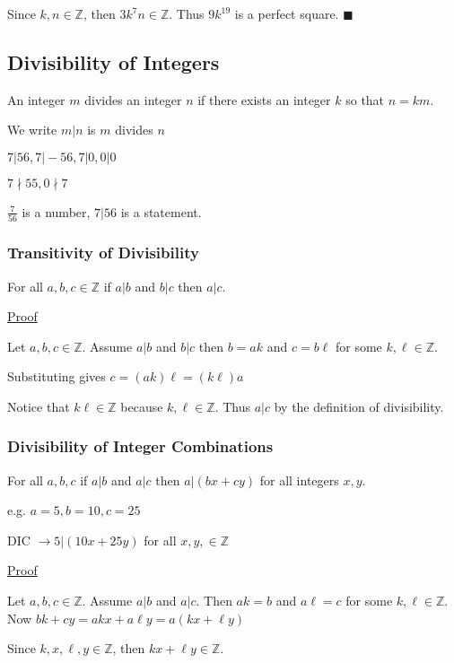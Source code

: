 \documentclass{article}
\begin{document}
Since $k,n \in \mathbb{Z}$, then $3k^7n \in \mathbb{Z}$. Thus $9k^{19}$ is a perfect square. $\blacksquare$

\subsection{Divisibility of Integers}

An integer $m$ divides an integer $n$ if there exists an integer $k$ so that $n = km$.

We write $m \vert n$ is $m$ divides $n$

$7 \vert 56, 7\vert-56, 7\vert0, 0\vert0$

$7 \nmid 55, 0 \nmid 7$

$\frac{7}{56}$ is a number, $7 \vert 56$ is a statement.

\subsubsection{Transitivity of Divisibility}

For all $a,b,c \in \mathbb{Z}$ if $a \vert b$ and $b \vert c$ then $a \vert c$.

\underline{Proof}

Let $a,b,c \in \mathbb{Z}$. Assume $a \vert b$ and $b \vert c$ then $b = ak$ and $c = b\ell$ for some $k,\ell \in \mathbb{Z}$.


Substituting gives $c = (ak) \ell = (k \ell)a$

Notice that $k\ell \in \mathbb{Z}$ because $k,\ell \in \mathbb{Z}$. Thus $a \vert c$ by the definition of divisibility.

\subsubsection{Divisibility of Integer Combinations}

For all $a,b,c$ if $a \vert b$ and $a \vert c$ then $a | (bx + cy)$ for all integers $x,y$.

e.g. $a = 5, b = 10, c = 25$

DIC $\rightarrow 5 \vert (10x + 25y)$ for all $x,y,\in \mathbb{Z}$

\underline{Proof}

Let $a,b,c \in \mathbb{Z}$. Assume $a \vert b$ and $a \vert c$. Then $ak = b$ and $a\ell = c$ for some $k, \ell \in \mathbb{Z}$. Now $bk + cy = akx + a\ell y = a(kx + \ell y)$

Since $k, x, \ell, y \in \mathbb{Z}$, then $kx + \ell y \in \mathbb{Z}$.
\end{document}
